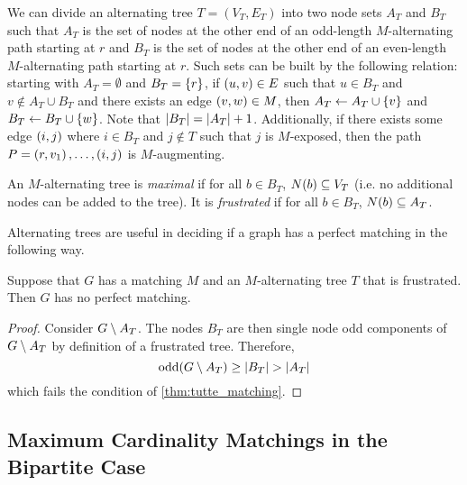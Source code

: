 We can divide an alternating tree $T = (V_T, E_T)$ into two node sets $A_T$ and $B_T$ such that $A_T$ is the set of nodes 
at the other end of an odd-length $M$-alternating path starting at $r$ and $B_T$ is the set of nodes at the other end 
of an even-length $M$-alternating path starting at $r$. Such sets can be built by the following relation: 
starting with $A_T = \emptyset$ and $B_T = \lrc{r}$, if $\lrp{u, v} \in E$ such that $u \in B_T$ and $v \notin A_T \cup B_T$ and there 
exists an edge $\lrp{v, w} \in M$, then $A_T \gets A_T \cup \lrc{v}$ and $B_T \gets B_T \cup \lrc{w}$. 
Note that $\abs{B_T} = \abs{A_T} + 1$. 
Additionally, if there exists some 
edge $\lrp{i, j}$ where $i \in B_T$ and $j \notin T$ such that $j$ is $M$-exposed, then the path $P = \lrp{r, v_1}, \ldots, \lrp{i, j}$
is $M$-augmenting. 

\begin{definition}
    An $M$-alternating tree is \emph{maximal} if for all $b \in B_T$, $\f[N]{b} \sse V_T$ (i.e.\! no additional nodes can be added to the tree).
    It is \emph{frustrated} if for all $b \in B_T$, $\f[N]{b} \sse A_T$.
    \label{def:maximal_alternating_tree}
\end{definition} 

Alternating trees are useful in deciding if a graph has a perfect matching in the following way. 

\begin{lemma}
    Suppose that $G$ has a matching $M$ and an $M$-alternating tree $T$ that is frustrated. Then $G$ has no perfect matching. 
    \label{lem:frustrated_tree_perfect_matching}
\end{lemma}
\begin{proof}
    Consider $G \sm A_T$. The nodes $B_T$ are then single node odd components of $G \sm A_T$ by definition of
    a frustrated tree. Therefore, 
    \begin{equation*}
        \odd{G \sm A_T} \geq \abs{B_T} > \abs{A_T}
    \end{equation*}
    which fails the condition of \cref{thm:tutte_matching}. 
\end{proof}

\subsection{Maximum Cardinality Matchings in the Bipartite Case}

